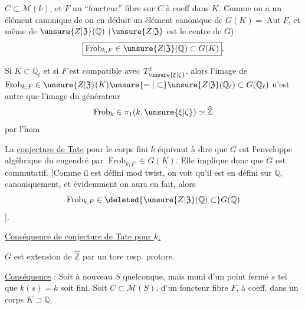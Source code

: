 $C\subset \mathcal{M}(k)$, et $F$ un ``foncteur'' fibre sur
$C$ à coeff dans $K$. Comme on a un élément
canonique de
on en déduit un élément canonique de
$G(K)=\operatorname{Aut}F$, et même de $\unsure{Z|\mathfrak Z}(\mathbb{Q})$
($\unsure{Z|\mathfrak Z}$ est le centre de $G$)
\[
 \boxed{\operatorname{Frob}_{k,F}\in
 \unsure{Z|\mathfrak Z}(\mathbb{Q})\subset G(K)}.
\]

Si $K\subset\mathbb{Q}_\ell$ et si $F$ est compatible avec
$T^\ell_{\unsure{\xi|\zeta}}$, alors l'image de
$\operatorname{Frob}_{k,F}\in\unsure{Z|\mathfrak Z}(K)
\unsure{=|\subset}\unsure{Z|\mathfrak Z}(\mathbb{Q}_\ell)\subset G(\mathbb{Q}_\ell)$
n'est autre que l'image du
générateur
\[
 \operatorname{Frob}_k\in\pi_1(k,\unsure{\xi|\zeta})\simeq\widehat{\mathbb{Z}}
\]
par l'hom

La \uline{conjecture de Tate} pour le corps
fini $k$ équivaut à dire que $G$ est
l'enveloppe algébrique du  engendré
par $\operatorname{Frob}_{k,F}\in G(K)$.
Elle implique donc
que $G$ est commutatif. [Comme il est
défini mod twist, on voit qu'il est en
 défini sur $\mathbb{Q}$, canoniquement, et
évidemment on aura en fait, alors
\[
 \operatorname{Frob}_{k,F}\in\deleted{\unsure{Z|\mathfrak Z}(\mathbb{Q})\subset}G(\mathbb{Q})
\]
].

\uline{Conséquence de conjecture de Tate pour $k$.}

$G$ est extension 
de $\widehat{\mathbb{Z}}$ par un tore resp. protore.

\uline{Conséquence} : Soit à nouveau $S$ quelconque,
mais muni d'un point fermé $s$ tel que
$k(s)=k$ soit fini. Soit $C\subset \mathcal{M}(S)$,
d'un foncteur fibre $F$,
à coeff. dans un corps $K\supset\mathbb{Q}$,

